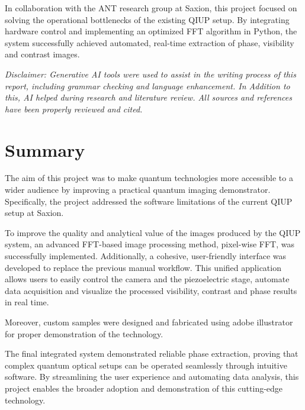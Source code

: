 \documentclass[12pt,a4paper]{article}
\begin{document}
In collaboration with the \ac{ANT} research group at Saxion, this project focused on solving the operational bottlenecks of the existing \ac{QIUP} setup. By integrating hardware control and implementing an optimized \ac{FFT} algorithm in Python, the system successfully achieved automated, real-time extraction of phase, visibility and contrast images. 

\vspace{1cm}
\begin{footnotesize}
\textit{Disclaimer: Generative AI tools were used to assist in the writing process of this report, including grammar checking and language enhancement. In Addition to this, AI helped during research and literature review. All sources and references have been properly reviewed and cited.}
\end{footnotesize}

\newpage
\section*{Summary}
The aim of this project was to make quantum technologies more accessible to a wider audience by improving a practical quantum imaging demonstrator. Specifically, the project addressed the software limitations of the current \ac{QIUP} setup at Saxion. 

To improve the quality and analytical value of the images produced by the \ac{QIUP} system, an advanced \ac{FFT}-based image processing method, pixel-wise \ac{FFT}, was successfully implemented. Additionally, a cohesive, user-friendly interface was developed to replace the previous manual workflow. This unified application allows users to easily control the camera and the piezoelectric stage, automate data acquisition and visualize the processed visibility, contrast and phase results in real time. 

Moreover, custom samples were designed and fabricated using adobe illustrator for proper demonstration of the technology.

The final integrated system demonstrated reliable phase extraction, proving that complex quantum optical setups can be operated seamlessly through intuitive software. By streamlining the user experience and automating data analysis, this project enables the broader adoption and demonstration of this cutting-edge technology.

\newpage
\tableofcontents

\newpage
\end{document}
